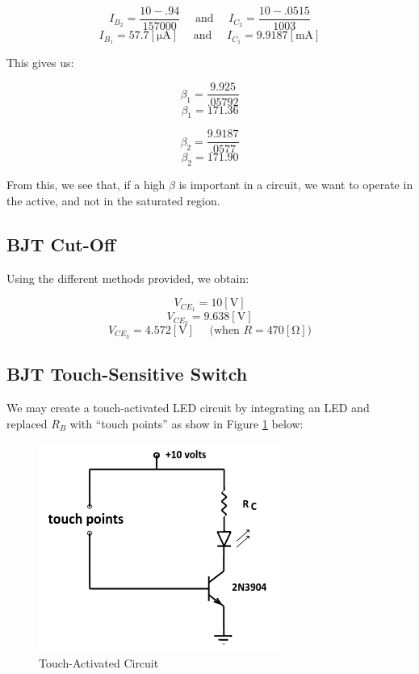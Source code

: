 \documentclass[
	letterpaper, %
	10pt, %
]{CSUniSchoolLabReport}
\begin{document}
$$I_{B_2}=\frac{10-.94}{157000}\quad\text{ and }\quad I_{C_2}=\frac{10-.0515}{1003}$$
$$\boxed{I_{B_1}=57.7[\si{\micro\ampere}]\quad\text{ and }\quad I_{C_1}=9.9187[\si{\milli\ampere}]}$$

This gives us:

$$\beta_1=\frac{9.925}{.05792}$$
$$\boxed{\beta_1=171.36}$$

$$\beta_2=\frac{9.9187}{.0577}$$
$$\boxed{\beta_2=171.90}$$

From this, we see that, if a high $\beta$ is important in a circuit, we want to operate in the active, and not in the saturated region.

\subsection{BJT Cut-Off}

Using the different methods provided, we obtain:

$$V_{CE_1}=10[\si{\volt}]$$
$$V_{CE_2}=9.638[\si{\volt}]$$
$$V_{CE_3}=4.572[\si{\volt}]\quad\text{ (when $R=470[\si{\ohm}]$)}$$

\subsection{BJT Touch-Sensitive Switch}

We may create a touch-activated LED circuit by integrating an LED and replaced $R_B$ with ``touch points'' as show in Figure \ref{fig:2} below:

\begin{figure}[H]
  \centering
  \includegraphics[width=.7\textwidth]{Figures/L3F2}
  \caption{Touch-Activated Circuit}
  \label{fig:2}
\end{figure}
\end{document}
